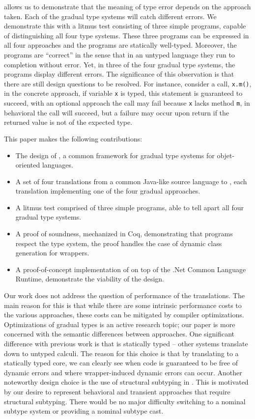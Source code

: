 \documentclass[a4paper,USenglish]{tex/lipics-v2016}
\newcommand{\code}[1]{{\tt #1}\xspace}
\begin{document}
\kafka allows us to demonstrate that the meaning of type error depends on the
approach taken.  Each of the gradual type systems will catch different errors.
We demonstrate this with a litmus test consisting of three simple programs,
capable of distinguishing all four type systems. These three programs can be
expressed in all four approaches and the programs are statically well-typed.
Moreover, the programs are ``correct'' in the sense that in an untyped
language they run to completion without error. Yet, in three of the four
gradual type systems, the programs display different errors. The significance of this
observation is that there are still design questions to be resolved. For
instance, consider a call, \code{x.m()}, in the concrete approach, if variable
\code x is typed, this statement is guaranteed to succeed, with an optional
approach the call may fail because \code{x} lacks method \code{m}, in
behavioral the call will succeed, but a failure may occur upon return if the
returned value is not of the expected type.

This paper makes the following contributions:
\begin{itemize}  
  \item The design of \kafka, a common framework for gradual type systems for
  objet-oriented languages.
\item A set of four translations from a common Java-like source language to
  \kafka, each translation implementing one of the four gradual approaches.
\item A litmus test comprised of three simple programs, able to tell
apart all four gradual type systems.
\item A proof of soundness, mechanized in Coq, demonstrating that \kafka
  programs respect the \kafka type system, the proof handles the case of
  dynamic class generation for wrappers.
\item A proof-of-concept implementation of \kafka on top of the .Net Common
  Language Runtime, demonstrate the viability of the design.
\end{itemize}

\noindent Our work does not address the question of performance of the
translations. The main reason for this is that while there are some intrinsic
performance costs to the various approaches, these costs can be mitigated by
compiler optimizations. Optimizations of gradual types is an active research
topic; our paper is more concerned with the semantic differences between
approaches.  One significant difference with previous work is that \kafka is
statically typed -- other systems translate down to untyped calculi. The
reason for this choice is that by translating to a statically typed core, we
can clearly see when code is guaranteed to be free of dynamic errors and where
wrapper-induced dynamic errors can occur. Another noteworthy design choice is
the use of structural subtyping in \kafka. This is motivated by our desire to
represent behavioral and transient approaches that require structural
subtyping.  There would be no major difficulty switching \kafka to a nominal
subtype system or providing a nominal subtype cast.
\end{document}
